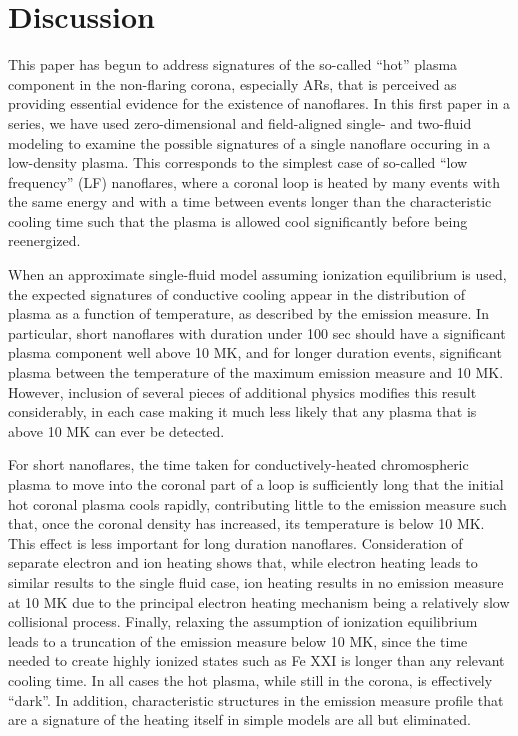 \documentclass[]{aastex}
\begin{document}
	\section{Discussion}
	\label{sec:discussion}
	\par This paper has begun to address signatures of the so-called ``hot'' plasma component in the non-flaring corona, especially ARs, that is perceived as providing essential evidence for the existence of nanoflares. In this first paper in a series, we have used zero-dimensional and field-aligned single- and two-fluid modeling to examine the possible signatures of a single nanoflare occuring in a low-density plasma. This corresponds to the simplest case of so-called ``low frequency'' (LF) nanoflares, where a coronal loop is heated by many events with the same energy and with a time between events longer than the characteristic cooling time such that the plasma is allowed cool significantly before being reenergized.
\par When an approximate single-fluid model assuming ionization equilibrium is used, the expected signatures of conductive cooling appear in the distribution of plasma as a function of temperature, as described by the emission measure. In particular, short nanoflares with duration under 100 sec should have a significant plasma component well above 10 MK, and for longer duration events, significant plasma between the temperature of the maximum emission measure and 10 MK. However, inclusion of several pieces of additional physics modifies this result considerably, in each case making it much less likely that any plasma that is above 10 MK can ever be detected.
%
\par For short nanoflares, the time taken for conductively-heated chromospheric plasma to move into the coronal part of a loop is sufficiently long that the initial hot coronal plasma cools rapidly, contributing little to the emission measure such that, once the coronal density has increased, its temperature is below 10 MK. This effect is less important for long duration nanoflares. Consideration of separate electron and ion heating shows that, while electron heating leads to similar results to the single fluid case, ion heating results in no emission measure at 10 MK due to the principal electron heating mechanism being a relatively slow collisional process. Finally, relaxing the assumption of ionization equilibrium leads to a truncation of the emission measure below 10 MK, since the time needed to create highly ionized states such as Fe XXI is longer than any relevant cooling time. In all cases the hot plasma, while still in the corona, is effectively ``dark''. In addition, characteristic structures in the emission measure profile that are a signature of the heating itself in simple models are all but eliminated.
\end{document}
